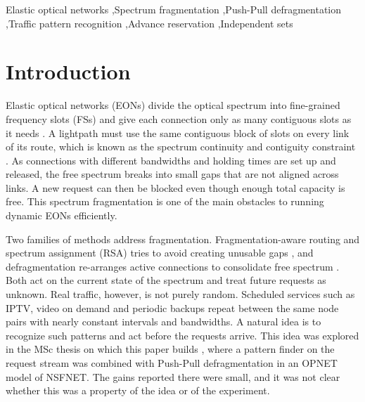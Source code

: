 \documentclass[preprint,12pt]{elsarticle}
\begin{document}
\begin{frontmatter}
\begin{keyword}
Elastic optical networks \sep Spectrum fragmentation \sep Push-Pull defragmentation \sep Traffic pattern recognition \sep Advance reservation \sep Independent sets
\end{keyword}

\end{frontmatter}

\linenumbers

\section{Introduction}
Elastic optical networks (EONs) divide the optical spectrum into fine-grained frequency slots (FSs) and give each connection only as many contiguous slots as it needs \cite{jinno2009,gerstel2012}. A lightpath must use the same contiguous block of slots on every link of its route, which is known as the spectrum continuity and contiguity constraint \cite{chatterjee2015,talebi2014}. As connections with different bandwidths and holding times are set up and released, the free spectrum breaks into small gaps that are not aligned across links. A new request can then be blocked even though enough total capacity is free. This spectrum fragmentation is one of the main obstacles to running dynamic EONs efficiently.

Two families of methods address fragmentation. Fragmentation-aware routing and spectrum assignment (RSA) tries to avoid creating unusable gaps \cite{shen2015,abkenar2017,athari2019}, and defragmentation re-arranges active connections to consolidate free spectrum \cite{patel2011,wang2013,zhang2013,cugini2013}. Both act on the current state of the spectrum and treat future requests as unknown. Real traffic, however, is not purely random. Scheduled services such as IPTV, video on demand and periodic backups repeat between the same node pairs with nearly constant intervals and bandwidths. A natural idea is to recognize such patterns and act before the requests arrive. This idea was explored in the MSc thesis on which this paper builds \cite{malayeri2022}, where a pattern finder on the request stream was combined with Push-Pull defragmentation in an OPNET model of NSFNET. The gains reported there were small, and it was not clear whether this was a property of the idea or of the experiment.
\end{document}
